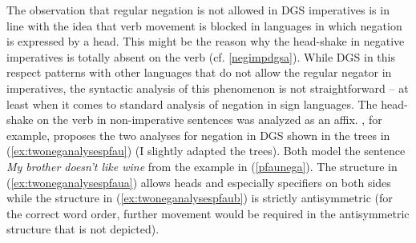 The observation that regular negation is not allowed in DGS imperatives is in line with the idea that verb movement is blocked in languages in which negation is expressed by a head. This might be the reason why the head-shake in negative imperatives is totally absent on the verb (cf. \ref{negimpdgsa}). While DGS in this respect patterns with other languages that do not allow the regular negator in imperatives, the syntactic analysis of this phenomenon is not straightforward -- at least when it comes to standard analysis of negation in sign languages. The head-shake on the verb in non-imperative sentences was analyzed as an affix. \citet[57]{pfau2016featural}, for example, proposes the two analyses for negation in DGS shown in the trees in (\ref{ex:twoneganalysespfau}) (I slightly adapted the trees). Both model the sentence \textit{My brother doesn't like wine} from the example in (\ref{pfaunega}). The structure in (\ref{ex:twoneganalysespfaua}) allows heads and especially specifiers on both sides while the structure in (\ref{ex:twoneganalysespfaub}) is strictly antisymmetric (for the correct word order, further movement would be required in the antisymmetric structure that is not depicted).


\begin{exe}
\ex\label{ex:twoneganalysespfau}
\setlength{\columnsep}{-80pt}
\begin{multicols}{2}
\begin{xlist}
\ex\label{ex:twoneganalysespfaua}
\hspace{-1.5cm}

\ex \label{ex:twoneganalysespfaub}
\end{xlist}
\end{multicols}
\end{exe}


